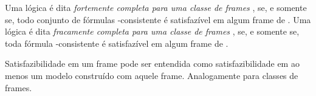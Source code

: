         \begin{proposicao}
            \label{prop:CompletudeAlternativa}
            Uma lógica  é dita \textit{fortemente completa para uma classe de frames }, se, e somente se, todo conjunto de fórmulas
            -consistente é satisfazível em algum frame de .
            Uma lógica  é dita \textit{fracamente completa para uma classe de frames }, se, e somente se, toda fórmula
            -consistente é satisfazível em algum frame de .
        \end{proposicao}

        Satisfazibilidade em um frame pode ser entendida como satisfazibilidade em ao menos um modelo construído com aquele frame. Analogamente para classes de frames.

